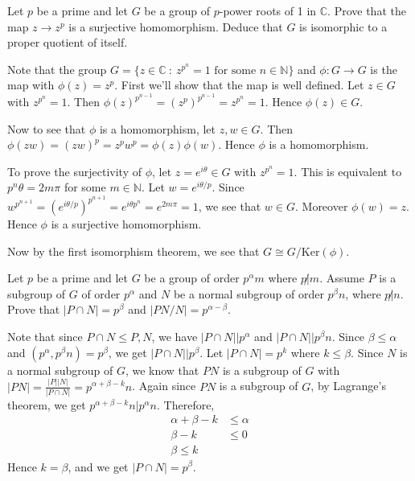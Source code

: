 \documentclass[12pt]{exam}
\theoremstyle{plain} %
\theoremstyle{definition} %
\theoremstyle{remark} %
\begin{document}
\begin{questions}
  \question
  Let $p$ be a prime and let $G$ be a group of $p$-power roots of 1 in $\mathbb{C}$. Prove that the map $z \to z^p$ is a surjective homomorphism. Deduce that $G$ is isomorphic to a proper quotient of itself.
  \begin{solution}
    Note that the group $G = \{ z \in \mathbb{C}  \ : \   z^{p^n} = 1 \textrm{ for some } n \in \mathbb{N} \}$ and $\phi: G \to G$ is the map with $\phi(z) = z^p$. First we'll show that the map is well defined. Let $z \in G$ with $z^{p^n} = 1$. Then $\phi(z)^{p^{n-1}} = (z^{p})^{p^{n-1}} = z^{p^n} = 1$. Hence $\phi(z) \in G$.

    Now to see that $\phi$ is a homomorphism, let $z, w \in G$. Then $\phi(zw) = (zw)^p  = z^p w^p = \phi(z) \phi(w)$. Hence $\phi$ is a homomorphism.

    To prove the surjectivity of $\phi$, let $z = e^{  i \theta} \in G$ with $z^{p^n} = 1$. This is equivalent to $p^n \theta= 2m\pi$ for some $m \in \mathbb{N}$. Let $w = e^{i \theta/p}$. Since $w^{p^{n+1}} = (e^{i \theta/p})^{p^{n+1}} = e^{i \theta p^{n}} = e^{ 2 m \pi} = 1$, we see that $ w \in G$. Moreover $\phi(w) = z$. Hence $ \phi$ is a surjective homomorphism.

    Now by the first isomorphism theorem, we see that $ G \cong G/\textrm{Ker}(\phi)$.
  \end{solution}

  \question
  Let $p$ be a prime and let $G$ be a group of order $p^{\alpha}m$ where $p \not| m$. Assume $P$ is a subgroup of $G$ of order $p^\alpha$ and $ N$ be a normal subgroup of order $p^{ \beta} n$, where $p \not | n$. Prove that $|P \cap N| = p^\beta$ and $|PN/N| = p^{\alpha -\beta}$.
  \begin{solution}
    Note that since $P \cap N \leqslant P, N$, we have $|P\cap N|\big|p^{\alpha}$ and $|P \cap N| \big| p^{\beta}n$. Since $\beta \le \alpha$ and $(p^{\alpha}, p^{\beta}n) = p^{\beta}$, we get $|P\cap N| \big| p^{\beta}$. Let $|P \cap N | = p^k$ where $k \le \beta$. Since $ N$ is a normal subgroup of $G$, we know that $PN$ is a subgroup of $G$ with $|PN| = \frac{|P||N|}{|P \cap N|} = p^{\alpha + \beta - k}n$. Again since $PN$ is a subgroup of $G$, by Lagrange's theorem, we get $p^{\alpha + \beta - k}n \big| p^{\alpha}n$. Therefore,
    \begin{align*}
      \alpha + \beta - k &\le \alpha \\
      \beta - k & \le 0 \\
      \beta \le k
    \end{align*}
    Hence $k = \beta$, and we get $|P \cap N| = p^{\beta}$.


\end{solution}
\end{questions}
\end{document}
